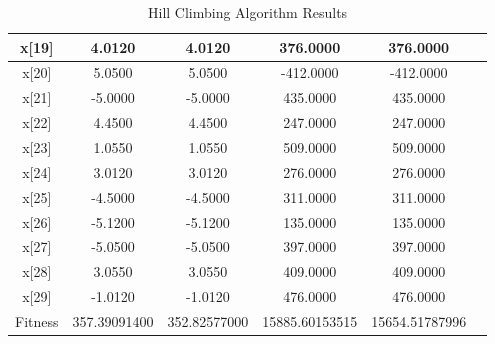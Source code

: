 \documentclass{article}
\begin{document}
\begin{CJK}{UTF8}{gbsn}
\begin{table}[!hbp]
\begin{tabular}{|c|c|c|c|c|c|}
\hline
x[19]	&	4.0120	&	4.0120	&	376.0000	&	376.0000	\\
\hline
x[20]	&	5.0500	&	5.0500	&	-412.0000	&	-412.0000	\\
\hline
x[21]	&	-5.0000	&	-5.0000	&	435.0000	&	435.0000	\\
\hline
x[22]	&	4.4500	&	4.4500	&	247.0000	&	247.0000	\\
\hline
x[23]	&	1.0550	&	1.0550	&	509.0000	&	509.0000	\\
\hline
x[24]	&	3.0120	&	3.0120	&	276.0000	&	276.0000	\\
\hline
x[25]	&	-4.5000	&	-4.5000	&	311.0000	&	311.0000	\\
\hline
x[26]	&	-5.1200	&	-5.1200	&	135.0000	&	135.0000	\\
\hline
x[27]	&	-5.0500	&	-5.0500	&	397.0000	&	397.0000	\\
\hline
x[28]	&	3.0550	&	3.0550	&	409.0000	&	409.0000	\\
\hline
x[29]	&	-1.0120	&	-1.0120	&	476.0000	&	476.0000	\\
\hline
\hline
Fitness &  357.39091400 &  352.82577000 & 15885.60153515        & 15654.51787996        \\
\hline
\hline
\end{tabular}
\caption{Hill Climbing Algorithm Results} 
\end{table}


\end{CJK}
\end{document}
